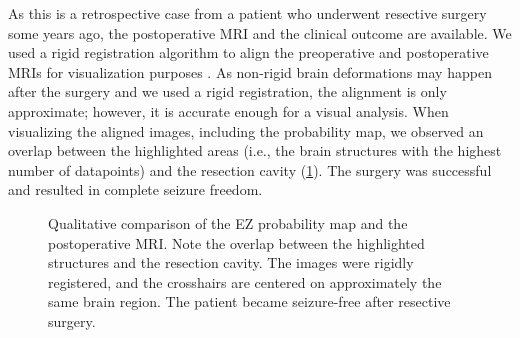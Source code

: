 As this is a retrospective case from a patient who underwent resective surgery some years ago, the postoperative \ac{MRI} and the clinical outcome are available.
We used a rigid registration algorithm to align the preoperative and postoperative \acp{MRI} for visualization purposes \cite{ourselin_block_2000}.
As non-rigid brain deformations may happen after the surgery and we used a rigid registration, the alignment is only approximate; however, it is accurate enough for a visual analysis.
When visualizing the aligned images, including the probability map, we observed an overlap between the highlighted areas (i.e., the brain structures with the highest number of datapoints) and the resection cavity (\cref{fig:svt_resection}).
The surgery was successful and resulted in complete seizure freedom.

\begin{figure}[!ht]
  \centering
  \caption[Comparison of the probability map and the postoperative MRI]{
    Qualitative comparison of the \ac{EZ} probability map and the postoperative \ac{MRI}.
    Note the overlap between the highlighted structures and the resection cavity.
    The images were rigidly registered, and the crosshairs are centered on approximately the same brain region.
    The patient became seizure-free after resective surgery.
  }
  \label{fig:svt_resection}
\end{figure}
